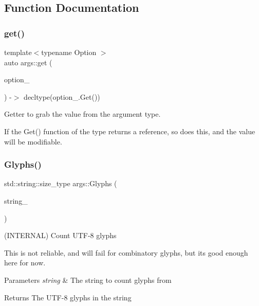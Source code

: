 \subsection{Function Documentation}
\mbox{\label{namespaceargs_adbff5cc15191b28f5a1aa74344172ba1}} 
\subsubsection{\texorpdfstring{get()}{get()}}
{\footnotesize\ttfamily template$<$typename Option $>$ \\
auto args\+::get (\begin{DoxyParamCaption}\item[{Option \&}]{option\+\_\+ }\end{DoxyParamCaption}) -\/$>$ decltype(option\+\_\+.\+Get())
    }

Getter to grab the value from the argument type.

If the Get() function of the type returns a reference, so does this, and the value will be modifiable. \mbox{\label{namespaceargs_ade9c2a979cc8989ca07f0dfc84b9d19f}} 
\subsubsection{\texorpdfstring{Glyphs()}{Glyphs()}}
{\footnotesize\ttfamily std\+::string\+::size\+\_\+type args\+::\+Glyphs (\begin{DoxyParamCaption}\item[{const std\+::string \&}]{string\+\_\+ }\end{DoxyParamCaption})\hspace{0.3cm}{\ttfamily [inline]}}

(I\+N\+T\+E\+R\+N\+AL) Count U\+T\+F-\/8 glyphs

This is not reliable, and will fail for combinatory glyphs, but it\textquotesingle{}s good enough here for now.


\begin{DoxyParams}{Parameters}
{\em string} & The string to count glyphs from \\
\hline
\end{DoxyParams}
\begin{DoxyReturn}{Returns}
The U\+T\+F-\/8 glyphs in the string 
\end{DoxyReturn}
\mbox{\label{namespaceargs_aa3191c4993dfc1927874db189c43e7e3}} 
